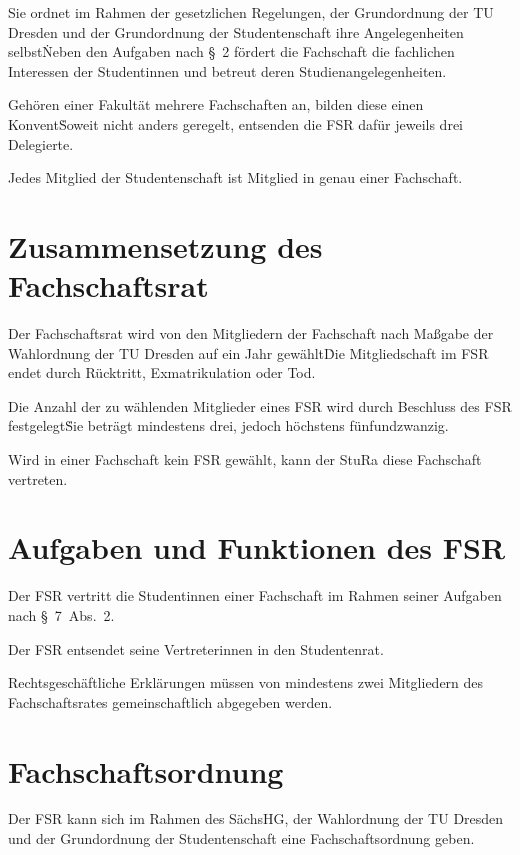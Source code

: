 \begin{multicols}{2}
\Abs \Satz Sie ordnet im Rahmen der gesetzlichen Regelungen, der Grundordnung der TU Dresden und der Grundordnung der Studentenschaft ihre Angelegenheiten selbst\. Neben den Aufgaben nach §~2 fördert die Fachschaft die fachlichen Interessen der Studentinnen und betreut deren Studienangelegenheiten.

\Abs \Satz Gehören einer Fakultät mehrere Fachschaften an, bilden diese einen Konvent\. Soweit nicht anders geregelt, entsenden die FSR dafür jeweils drei Delegierte.

\Abs \Satz Jedes Mitglied der Studentenschaft ist Mitglied in genau einer Fachschaft.



\section{Zusammensetzung des Fachschaftsrat}

\Abs \Satz Der Fachschaftsrat wird von den Mitgliedern der Fachschaft nach Maßgabe der Wahlordnung der TU Dresden auf ein Jahr gewählt\. Die Mitgliedschaft im FSR endet durch Rücktritt, Exmatrikulation oder Tod.

\Abs \Satz Die Anzahl der zu wählenden Mitglieder eines FSR wird durch Beschluss des FSR festgelegt\. Sie beträgt mindestens drei, jedoch höchstens fünfundzwanzig.

\Abs \Satz Wird in einer Fachschaft kein FSR gewählt, kann der StuRa diese Fachschaft vertreten.



\section{Aufgaben und Funktionen des FSR}

\Abs \Satz Der FSR vertritt die Studentinnen einer Fachschaft im Rahmen seiner Aufgaben nach §~7~Abs.~2.

\Abs \Satz Der FSR entsendet seine Vertreterinnen in den Studentenrat.

\Abs \Satz Rechtsgeschäftliche Erklärungen müssen von mindestens zwei Mitgliedern des Fachschaftsrates gemeinschaftlich abgegeben werden.



\section{Fachschaftsordnung}

\Abs \Satz Der FSR kann sich im Rahmen des SächsHG, der Wahlordnung der TU Dresden und der Grundordnung der Studentenschaft eine Fachschaftsordnung geben.


\end{multicols}
